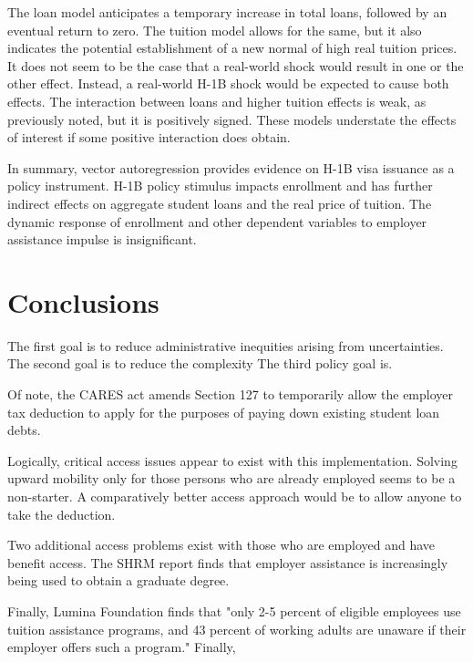 \documentclass[review]{elsarticle}
\begin{document}
The loan model anticipates a temporary increase in total loans, followed by an eventual return to zero.
The tuition model allows for the same, but it also indicates the potential establishment of a new normal
of high real tuition prices.
It does not seem to be the case that a real-world shock would result in one or the other effect.
Instead, a real-world H-1B shock would be expected to cause both effects.
The interaction between loans and higher tuition effects is weak, as previously noted, but it is positively signed.
These models understate the effects of interest if some positive interaction does obtain.

In summary, vector autoregression provides evidence on H-1B visa issuance as a policy instrument.
H-1B policy stimulus impacts enrollment and has further indirect effects on aggregate student loans and the real price of tuition.
The dynamic response of enrollment and other dependent variables to employer assistance impulse is insignificant.

\section{Conclusions}


The first goal is to reduce administrative inequities arising from uncertainties.
The second goal is to reduce the complexity
The third policy goal is.

Of note, the CARES act amends Section 127 to temporarily allow the employer tax deduction to apply for the purposes of paying down existing student loan debts.

Logically, critical access issues appear to exist with this implementation.
Solving upward mobility only for those persons who are already employed seems to be a non-starter.
A comparatively better access approach would be to allow anyone to take the deduction.

Two additional access problems exist with those who are employed and have benefit access.
The SHRM report finds that employer assistance is increasingly being used to obtain a graduate degree.


Finally, Lumina Foundation finds that
"only 2-5 percent of eligible employees use tuition assistance programs,
and 43 percent of working adults are unaware if their employer offers such a program."
Finally,
\end{document}
